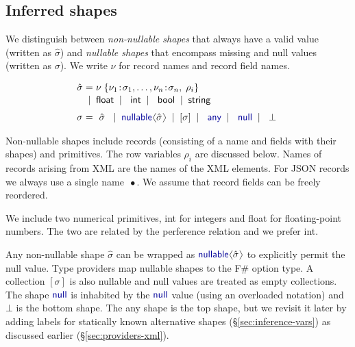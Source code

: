\documentclass[10pt,preprint,clearpagebib]{sigplanconf}
\newcommand{\langl}{\begin{picture}(4.5,7)
\put(1.1,2.5){\rotatebox{60}{\line(1,0){5.5}}}
\put(1.1,2.5){\rotatebox{300}{\line(1,0){5.5}}}
\end{picture}}
\newcommand{\rangl}{\begin{picture}(4.5,7)
\put(.9,2.5){\rotatebox{120}{\line(1,0){5.5}}}
\put(.9,2.5){\rotatebox{240}{\line(1,0){5.5}}}
\end{picture}}
\newcommand{\kvd}[1]{\textnormal{\textcolor{kvdclr}{\sffamily #1}}}
\newcommand{\ident}[1]{\textnormal{\sffamily #1}}
\newcommand{\lsep}[0]{\;\; | \;\;}
\newcommand{\narrow}[1]{\hspace{-0.7em} #1 \hspace{-0.7em}}
\begin{document}

\subsection{Inferred shapes}
\label{sec:inference-types}

We distinguish between \emph{non-nullable shapes} that always have a valid value (written as 
$\hat{\sigma}$) and \emph{nullable shapes} that encompass missing and \kvd{null} values 
(written as $\sigma$). We write $\nu$ for record names and record field names. 

\noindent
\begin{equation*}
\begin{array}{rcl}
 \hat{\sigma} &\narrow{=}& \nu \; \{ \nu_1 \!:\! \sigma_1, \ldots, \nu_n \!:\! \sigma_n,\; \rho_i  \} \\[0.1em]
                &\narrow{|}& \ident{float} \lsep \ident{int} \lsep \ident{bool} \lsep \ident{string} 
 \\[0.6em] 
       \sigma &\narrow{=}& ~\hat{\sigma}~ \lsep \kvd{nullable}\langl \hat{\sigma} \rangl \lsep [\sigma] \lsep \kvd{any} \lsep \kvd{null}  \lsep ~\bot~
\end{array}
\end{equation*}

\noindent
Non-nullable shapes include records (consisting of a name and fields with their shapes) and 
primitives. The row variables $\rho_i$ are discussed below. Names of records arising from XML are the names of the XML elements.
For JSON records we always use a single name $\,\bullet$. We assume that record fields can be freely
reordered.

We include two numerical primitives, \ident{int} for integers and \ident{float} for floating-point 
numbers. The two are related by the perference relation and we prefer \ident{int}.

Any non-nullable shape $\hat{\sigma}$ can be wrapped as $\kvd{nullable}\langl\hat{\sigma}\rangl$ to 
explicitly permit the \kvd{null} value. Type providers map \kvd{nullable} shapes to the F\# option
type. A collection $[\sigma]$ is also nullable and \kvd{null} values are treated as empty 
collections. The shape $\kvd{null}$ is inhabited by the $\kvd{null}$ value (using an overloaded 
notation) and $\bot$ is the bottom shape. The \kvd{any} shape is the top shape, but we revisit it 
later by adding labels for statically known alternative shapes (\S\ref{sec:inference-vars}) as 
discussed earlier (\S\ref{sec:providers-xml}).
\end{document}
